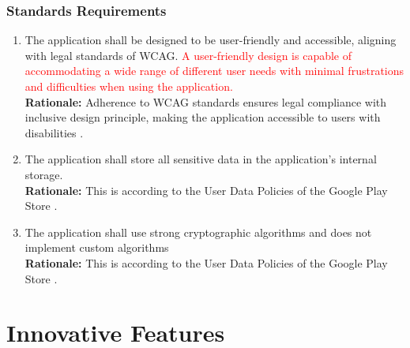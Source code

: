 \documentclass[]{article}
\begin{document}
\subsubsection{Standards Requirements}
\label{ssub:standards_requirements}
\begin{enumerate}[{LR-STD}1. ]
	\item The application shall be designed to be user-friendly and accessible, aligning with legal standards of WCAG. 
			\textcolor{red}{A user-friendly design is capable of accommodating a wide range of different user needs with minimal 
			frustrations and difficulties when using the application.}\\
	      {\bf Rationale:} Adherence to WCAG standards ensures legal compliance with inclusive design principle, making the application accessible to users with disabilities
	      \cite{2c}.
	\item The application shall store all sensitive data in the application's internal storage. \\
	      {\bf Rationale:} This is according to the User Data Policies of the Google Play Store
	      \cite{11c}.
	\item The application shall use strong cryptographic algorithms and does not implement custom algorithms \\
	      {\bf Rationale:} This is according to the User Data Policies of the Google Play Store
	      \cite{11c}.
\end{enumerate}



\section{Innovative Features}
\label{sec:innovative_features}
\end{document}
